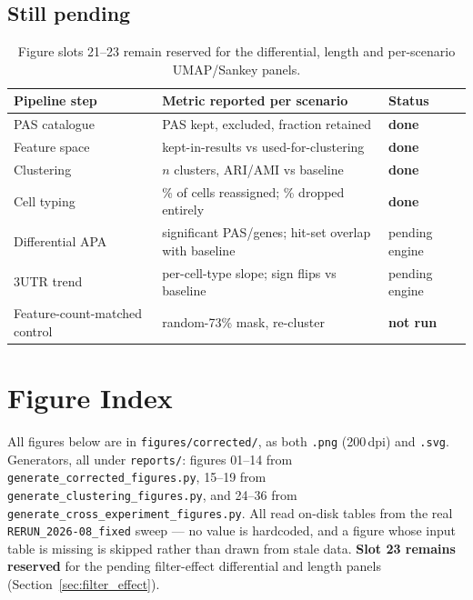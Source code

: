 \documentclass[11pt,a4paper]{article}
\begin{document}
\subsection{Still pending}

\begin{table}[htbp]
  \centering
  \small
  \begin{tabularx}{\textwidth}{lXl}
    \toprule
    \textbf{Pipeline step} & \textbf{Metric reported per scenario} & \textbf{Status} \\
    \midrule
    PAS catalogue & PAS kept, excluded, fraction retained & \textbf{done} \\
    Feature space & kept-in-results vs used-for-clustering & \textbf{done} \\
    Clustering & $n$ clusters, ARI/AMI vs baseline & \textbf{done} \\
    Cell typing & \% of cells reassigned; \% dropped entirely & \textbf{done} \\
    Differential APA & significant PAS/genes; hit-set overlap with baseline & pending engine \\
    3\textquotesingle{}UTR trend & per-cell-type slope; sign flips vs baseline & pending engine \\
    \midrule
    Feature-count-matched control & random-73\% mask, re-cluster & \textbf{not run} \\
    \bottomrule
  \end{tabularx}
  \caption{Figure slots 21--23 remain reserved for the differential, length and
    per-scenario UMAP/Sankey panels.}
  \label{tab:filter_effect_skeleton}
\end{table}

\appendix
\section{Figure Index}
\label{sec:figure_index}

All figures below are in \texttt{figures/corrected/}, as both \texttt{.png}
(200\,dpi) and \texttt{.svg}. Generators, all under \texttt{reports/}: figures
01--14 from \texttt{generate\_corrected\_figures.py}, 15--19 from
\texttt{generate\_clustering\_figures.py}, and 24--36 from
\texttt{generate\_cross\_experiment\_figures.py}. All read on-disk tables from
the real \texttt{RERUN\_2026-08\_fixed} sweep --- no value is hardcoded, and a
figure whose input table is missing is skipped rather than drawn from stale
data. \textbf{Slot 23 remains reserved} for the pending filter-effect differential and
length panels (Section~\ref{sec:filter_effect}).
\end{document}
